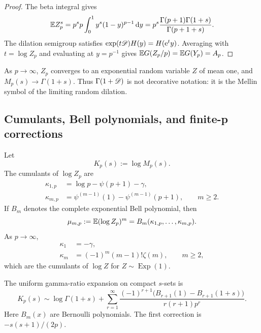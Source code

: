 \documentclass[11pt,oneside]{article}
\theoremstyle{definition}
\theoremstyle{remark}
\newcommand{\e}{\mathrm e}
\newcommand{\dd}{\,\mathrm d}
\begin{document}
\begin{proof}
The beta integral gives
\[
 \E Z_p^s=p^s p\int_0^1y^s(1-y)^{p-1}\dd y
 =p^s\frac{\Gamma(p+1)\Gamma(1+s)}{\Gamma(p+1+s)}.
\]
The dilation semigroup satisfies $\exp(t\Dop)H(y)=H(\e^t y)$.  Averaging with
\(t=\log Z_p\) and evaluating at $y=p^{-1}$ gives
$\mathbb E G(Z_p/p)=\mathbb E G(Y_p)=A_p$.
\end{proof}

As $p\to\infty$, $Z_p$ converges to an exponential random variable $Z$ of mean one, and
$M_p(s)\to\Gamma(1+s)$.  Thus $\Gamma(1+\mathscr D)$ is not decorative notation: it is the Mellin
symbol of the limiting random dilation.

\subsection{Cumulants, Bell polynomials, and finite-p corrections}

Let
\begin{equation}
 K_p(s):=\log M_p(s).
 \label{p4:eq:Kp}
\end{equation}
The cumulants of $\log Z_p$ are
\begin{align}
 \kappa_{1,p}&=\log p-\psi(p+1)-\gamma,
 \label{p4:eq:kappa1p}\\
 \kappa_{m,p}&=\psi^{(m-1)}(1)-\psi^{(m-1)}(p+1),
 \qquad m\geq2.
 \label{p4:eq:kappamp}
\end{align}
If $B_m$ denotes the complete exponential Bell polynomial, then
\begin{equation}
 \mu_{m,p}:=\mathbb E(\log Z_p)^m
 =B_m(\kappa_{1,p},\ldots,\kappa_{m,p}).
 \label{p4:eq:log-moments-Bell}
\end{equation}
As $p\to\infty$,
\begin{align}
 \kappa_1&=-\gamma,\label{p4:eq:kappa-limit-1}\\
 \kappa_m&=(-1)^m(m-1)!\zeta(m),\qquad m\geq2,
 \label{p4:eq:kappa-limit-m}
\end{align}
which are the cumulants of $\log Z$ for $Z\sim\operatorname{Exp}(1)$.

The uniform gamma-ratio expansion on compact $s$-sets is
\begin{equation}
 \boxed{
 K_p(s)\sim\log\Gamma(1+s)
 +\sum_{r=1}^{\infty}
 \frac{(-1)^{r+1}\bigl(B_{r+1}(1)-B_{r+1}(1+s)\bigr)}
 {r(r+1)p^r}.}
 \label{p4:eq:Bernoulli-gamma-ratio}
\end{equation}
Here $B_m(x)$ are Bernoulli polynomials.  The first correction is
$-s(s+1)/(2p)$.
\end{document}

